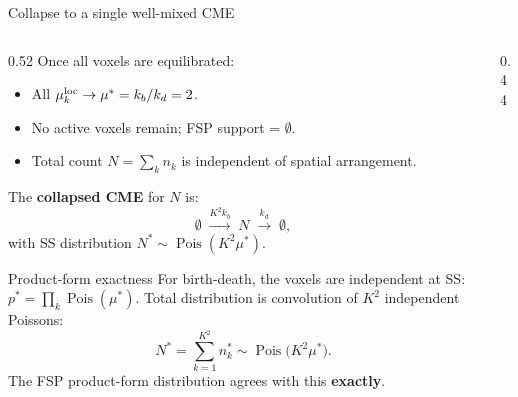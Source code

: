 \documentclass[10pt,aspectratio=169]{beamer}
\newcommand{\Pois}{\operatorname{Pois}}
\begin{document}
\begin{frame}[shrink=5]{Collapse to a single well-mixed CME}

  \begin{columns}[T]
    \begin{column}{0.52\textwidth}
      Once all voxels are equilibrated:
      \begin{itemize}\setlength\itemsep{0.4em}
        \item All $\mu_k^{\rm loc} \to \mu^* = k_b/k_d = 2$.
        \item No active voxels remain; FSP support = $\emptyset$.
        \item Total count $N = \sum_k n_k$ is independent of
              spatial arrangement.
      \end{itemize}

      \medskip
      The \textbf{collapsed CME} for $N$ is:
      \[
        \emptyset \;\xrightarrow{K^2 k_b}\; N \;\xrightarrow{k_d}\; \emptyset,
      \]
      with SS distribution $N^* \sim \Pois(K^2\mu^*)$.

      \bigskip
      \begin{block}{Product-form exactness}
        For birth-death, the voxels are independent at SS:
        $p^* = \prod_k \Pois(\mu^*)$.
        Total distribution is convolution of $K^2$ independent Poissons:
        \[
          N^* = \sum_{k=1}^{K^2} n_k^* \sim \Pois\!\bigl(K^2\mu^*\bigr).
        \]
        The FSP product-form distribution agrees with this \textbf{exactly}.
      \end{block}
    \end{column}
    \begin{column}{0.44\textwidth}
      \begin{center}
\end{center}
\end{column}
\end{columns}
\end{frame}
\end{document}

